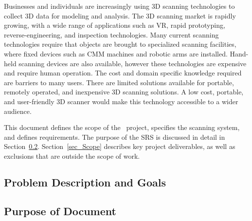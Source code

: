 \documentclass[12pt]{article}
\begin{document}

Businesses and individuals are increasingly using 3D scanning technologies to collect 3D data for modeling and analysis. The 3D scanning market is rapidly growing, with a wide range of applications such as VR, rapid prototyping, reverse-engineering, and inspection technologies. Many current scanning technologies require that objects are brought to specialized scanning facilities, where fixed devices such as CMM machines and robotic arms are installed. Hand-held scanning devices are also available,  however these technologies are expensive and require human operation. The cost and domain specific knowledge required are barriers to many users. There are limited solutions available for portable, remotely operated, and inexpensive 3D scanning solutions.  A low cost, portable, and user-friendly 3D scanner would make this technology accessible to a wider audience.
\newline
\par
This document defines the scope of the \progname\ project, specifies the scanning system, and defines requirements. The purpose of the SRS is discussed in detail in Section~\ref{sec_purpose}.  Section~\ref{sec_Scope} describes key project deliverables, as well as exclusions that are outside the scope of work.
\subsection{Problem Description and Goals}

\subsection{Purpose of Document}
\label{sec_purpose}

  
\end{document}
